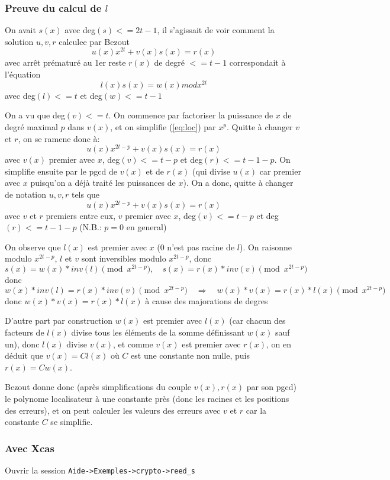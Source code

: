 \documentclass[a4paper,11pt]{article}
\begin{document}
\begin{giacjshere}
\subsubsection{Preuve du calcul de $l$}
On avait $s(x)$ avec deg$(s)<=2t-1$,
il s'agissait de voir comment la solution $u,v,r$ calculee par Bezout
\begin{equation}   \label{eq:loc}
 u(x)  x^{2t}+ v(x) s(x) = r(x) 
\end{equation}
avec arr\^et pr\'ematur\'e au 1er reste $r(x)$ de degr\'e $<=t-1$ 
correspondait \`a l'\'equation
\[   l(x) s(x) = w(x) mod x^{2t} \]
avec deg$(l)<=t$ et deg$(w)<=t-1$

On a vu que deg$(v)<=t$.
On commence par factoriser la puissance de $x$ de degr\'e maximal $p$ dans
$v(x)$, et on simplifie (\ref{eq:loc}) par $x^p$. 
Quitte \`a changer $v$ et $r$, on se
ramene donc \`a:
\[   u(x)  x^{2t-p}+ v(x) s(x) = r(x) \]
avec $v(x)$ premier avec $x$, deg$(v)<= t-p$ et deg$(r)<= t-1-p$.
On simplifie ensuite par le pgcd de $v(x)$ et de $r(x)$
(qui divise $u(x)$ car premier avec $x$ puisqu'on a d\'ej\`a trait\'e les
puissances de $x$).
On a donc, quitte \`a changer de notation $u,v,r$ tels que
\[  u(x)  x^{2t-p}+ v(x) s(x) = r(x) \]
avec $v$ et $r$ premiers entre eux, $v$ premier avec $x$,
deg$(v)<=t-p$ et deg$(r)<=t-1-p$ (N.B.: $p=0$ en general)

On observe que $l(x)$ est premier avec $x$ ($0$ n'est pas racine de $l$).
On raisonne modulo $x^{2t-p}$, $l$ et $v$ sont inversibles modulo $x^{2t-p}$,
donc 
\[ s(x) = w(x)*inv(l) \pmod{ x^{2t-p}},
\quad s(x) = r(x)*inv(v) \pmod {x^{2t-p}} \]
donc 
\[ w(x)*inv(l)=r(x)*inv(v) \pmod{x^{2t-p}} 
\quad \Rightarrow \quad w(x)*v(x)=r(x)*l(x) \pmod {x^{2t-p}} \]
donc $w(x)*v(x)=r(x)*l(x)$ \`a cause des majorations de degres

D'autre part par construction $w(x)$ est premier avec $l(x)$ (car chacun
des facteurs de $l(x)$ divise tous les \'el\'ements de la somme d\'efinissant
$w(x)$ sauf un), donc $l(x)$ divise $v(x)$, et comme $v(x)$ est premier
avec $r(x)$, on en d\'eduit que $v(x)=C l(x)$ o\`u $C$ est une constante non
nulle, puis $r(x) = C w(x)$.

Bezout donne donc (apr\`es simplifications du couple $v(x), r(x)$ par
son pgcd) le polynome localisateur \`a une constante pr\`es (donc les
racines et les positions des erreurs), et on peut calculer
les valeurs des erreurs avec $v$ et $r$ car la constante $C$ se simplifie.

\subsubsection{Avec Xcas}
Ouvrir la session \verb|Aide->Exemples->crypto->reed_s|



\end{giacjshere}
\end{document}
